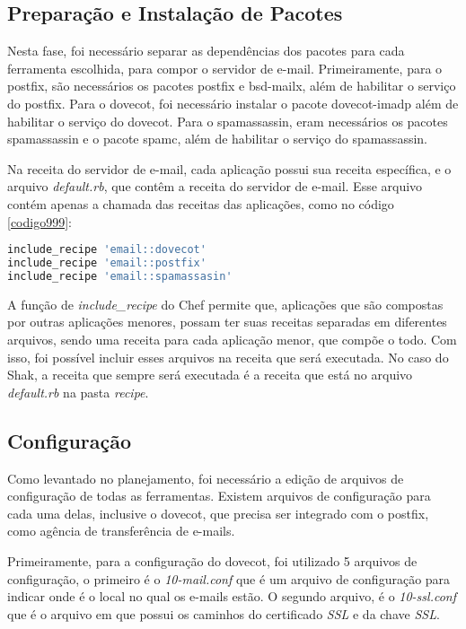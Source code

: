 \subsection{Preparação e Instalação de Pacotes }

Nesta fase, foi necessário separar as dependências dos pacotes para cada ferramenta
escolhida, para compor o servidor de e-mail. Primeiramente, para o postfix, são necessários
os pacotes postfix e bsd-mailx, além de habilitar o serviço do postfix. Para o dovecot,
foi necessário instalar o pacote dovecot-imadp além de habilitar o serviço do dovecot. 
Para o spamassassin, eram necessários os pacotes spamassassin e o pacote spamc, além 
de habilitar o serviço do spamassassin.

Na receita do servidor de e-mail, cada aplicação possui sua receita específica,
e o arquivo \textit{default.rb}, que contêm a receita do servidor de e-mail. Esse arquivo
contém apenas a chamada das receitas das aplicações, como no código \ref{codigo999}:

\begin{lstlisting}[language=Ruby,label=dice_index,caption={Exemplo da receita de email
composta pelas receitas das outras aplicações}, label=codigo999]
include_recipe 'email::dovecot'
include_recipe 'email::postfix'
include_recipe 'email::spamassasin'
\end{lstlisting}

A função de \textit{include\_recipe} do Chef permite que, aplicações que são compostas
por outras aplicações menores, possam ter suas receitas separadas em diferentes arquivos,
sendo uma receita para cada aplicação menor, que compõe o todo. Com isso, foi possível 
incluir esses arquivos na receita que será executada. No caso do Shak, a receita
que sempre será executada é a receita que está no arquivo \textit{default.rb} na
pasta \textit{recipe}.

\subsection{Configuração}

Como levantado no planejamento, foi necessário a edição de arquivos de configuração
de todas as ferramentas. Existem arquivos de configuração para cada uma delas, inclusive
o dovecot, que precisa ser integrado com o postfix, como agência de transferência
de e-mails.

Primeiramente, para a configuração do dovecot, foi utilizado 5 arquivos
de configuração, o primeiro é o \textit{10-mail.conf} que é um arquivo de configuração para
indicar onde é o local no qual os e-mails estão. O segundo arquivo, é o \textit{10-ssl.conf}
que é o arquivo em que possui os caminhos do certificado \textit{SSL} e da chave \textit{SSL}.

